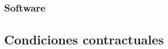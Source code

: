 \documentclass[11pt,letterpaper]{article}
\begin{document}
\subsubsection{Software}
%
%
%
%
\subsection{Condiciones contractuales}
%
%

% 	
\end{document}
